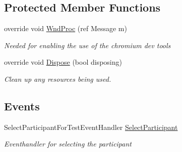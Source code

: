 \subsection*{Protected Member Functions}
\begin{DoxyCompactItemize}
\item 
override void \hyperlink{class_web_analyzer_1_1_u_i_1_1_select_participant_form_a384ab9932611a45d7ad7e938104474c7}{Wnd\+Proc} (ref Message m)
\begin{DoxyCompactList}\small\item\em Needed for enabling the use of the chromium dev tools \end{DoxyCompactList}\item 
override void \hyperlink{class_web_analyzer_1_1_u_i_1_1_select_participant_form_ae4a0da7ef5d15438618315aaa48fc565}{Dispose} (bool disposing)
\begin{DoxyCompactList}\small\item\em Clean up any resources being used. \end{DoxyCompactList}\end{DoxyCompactItemize}
\subsection*{Events}
\begin{DoxyCompactItemize}
\item 
Select\+Participant\+For\+Test\+Event\+Handler \hyperlink{class_web_analyzer_1_1_u_i_1_1_select_participant_form_af1734ad8760e4e4f42579efafcb7299d}{Select\+Participant}
\begin{DoxyCompactList}\small\item\em Eventhandler for selecting the participant \end{DoxyCompactList}\end{DoxyCompactItemize}
